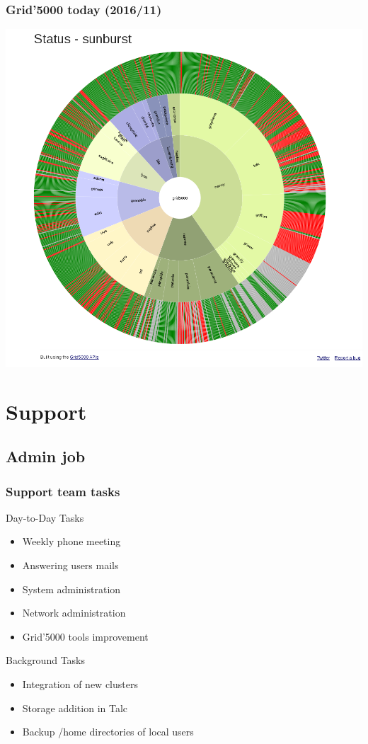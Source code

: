 \documentclass[11pt,compress]{beamer}
\begin{document}
\begin{frame}
\frametitle{Grid'5000 today (2016/11)}
\begin{center}
\includegraphics[scale=0.19]{figures/sunburst}
\end{center}
\end{frame}

\section{Support}
\subsection{Admin job}
\begin{frame}
\frametitle{Support team tasks}
Day-to-Day Tasks
\begin{itemize}
\item Weekly phone meeting
\item Answering users mails
\item System administration
\item Network administration
\item Grid'5000 tools improvement
\end{itemize}
Background Tasks
\begin{itemize}
\item Integration of new clusters
\item Storage addition in Talc
\item Backup /home directories of local users
\end{itemize}
\end{frame}
\end{document}
